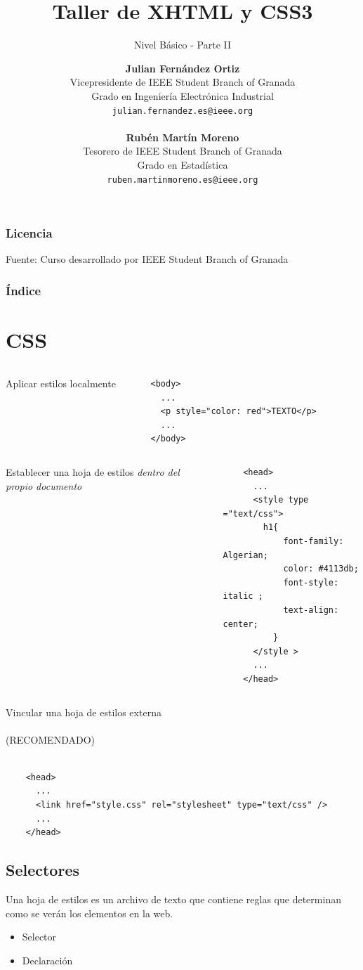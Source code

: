\documentclass{beamer}
\title[XHTML y CSS]{Taller de XHTML y CSS3}
\subtitle{Nivel Básico - Parte II}
\author[Julián Fernández, Rubén Martín]{
	\textbf{Julian Fernández Ortiz }
	\\
	\medskip
	\scriptsize{
	Vicepresidente de IEEE Student Branch of Granada\\
	Grado en Ingeniería Electrónica Industrial
	}	
	\\	
	\texttt{julian.fernandez.es@ieee.org}
	\\ \ \\
	\small{\textbf{Rubén Martín Moreno}}
	\\
	\medskip
	\scriptsize{
	Tesorero de IEEE Student Branch of Granada\\
	Grado en Estadística
	}
	\\
	\texttt{ruben.martinmoreno.es@ieee.org}
}
\date{}
\begin{document}
\frame{\titlepage}

\begin{frame}
\frametitle{Licencia}
\doclicenseThis
Fuente: Curso desarrollado por IEEE Student Branch of Granada
\end{frame}

\begin{frame}
  \frametitle{Índice}
  \tableofcontents
\end{frame}

\section{CSS}
\begin{frame}[fragile]
\begin{columns}[t]
	Aplicar estilos localmente
	\scriptsize{
	\begin{verbatim}
	<body>
	  ...
	  <p style="color: red">TEXTO</p>
	  ...
	</body>
	\end{verbatim}
	}
	
\end{columns}
\end{frame}

\begin{frame}[fragile]
\begin{columns}[t]
	Establecer una hoja de estilos \textit{dentro del propio documento}
	\scriptsize{
	\begin{verbatim}
	<head>
	  ...
	  <style type ="text/css">
		h1{
			font-family: Algerian;
			color: #4113db; 
			font-style: italic ;
			text-align: center;
		  }
	  </style >
	  ...
	</head>
	\end{verbatim}
	}

\end{columns}
\end{frame}

\begin{frame}[fragile]
	Vincular una hoja de estilos externa\\ \ \\ (RECOMENDADO)
	\\ \ \\
	\scriptsize{
	\begin{verbatim}
	<head>
	  ...
	  <link href="style.css" rel="stylesheet" type="text/css" />
	  ...
	</head>
	\end{verbatim}
	}	
\end{frame}
	\subsection{Selectores}
\begin{frame}
	Una hoja de estilos es un archivo de texto que contiene reglas que determinan como se verán los elementos en la web. 
	\begin{itemize}
	\item Selector
	\item Declaración
	\end{itemize}
\end{frame}
\end{document}
